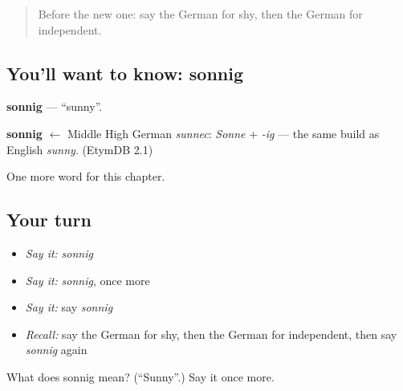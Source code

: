 \label{lesson:GE-C221-sonnig}



\begin{quote}
Before the new one: say the German for shy, then the German for independent.
\end{quote}

\subsection*{You'll want to know: sonnig}
\textbf{sonnig} — \textquotedblleft{}sunny\textquotedblright{}.

\begin{cousinweb}
\textbf{sonnig} $\leftarrow$ Middle High German \emph{sunnec}: \emph{Sonne} + \emph{-ig} — the same build as English \emph{sunny}. (EtymDB 2.1)
\end{cousinweb}

\begin{grammarlens}[title={What you've built}]
One more word for this chapter.
\end{grammarlens}

\subsection*{Your turn}
\begin{itemize}
\raggedright
  \item \emph{Say it:} \emph{sonnig}
  \item \emph{Say it:} \emph{sonnig}, once more
  \item \emph{Say it:} say \emph{sonnig}
  \item \emph{Recall:} say the German for shy, then the German for independent, then say \emph{sonnig} again
\end{itemize}

\begin{tcolorbox}[breakable,colback=teal!4,colframe=teal!35!black,title={Before you move on}]
What does sonnig mean? (\textquotedblleft{}Sunny\textquotedblright{}.) Say it once more.
\end{tcolorbox}
